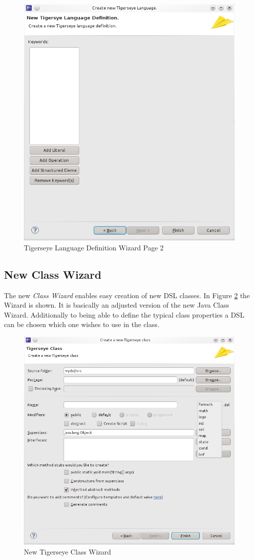 	\begin{figure}
	  \centering
	  \includegraphics[width=.5\textwidth,keepaspectratio=true]{../pics/tigerseye_language_definition_page2.png}
	  \caption{Tigerseye Language Definition Wizard Page 2}
	  \label{fig:tiger_lang_definition_page2}
	\end{figure}
	
	\subsection{New \tiger Class Wizard}
	  The new \emph{\tiger Class Wizard} enables easy creation of new DSL classes. In Figure \ref{fig:new_tiger_class_page} the Wizard is shown. It is basically an adjusted version of the new Java Class Wizard. Additionally to being able to define the typical class properties a DSL can be chosen which one wishes to use in the class.

	\begin{figure}
	  \centering
	  \includegraphics[width=.5\textwidth]{../pics/new_tigerseye_class_wizard.png}
	  \caption{New Tigerseye Class Wizard}
	  \label{fig:new_tiger_class_page}
	\end{figure}	
	
